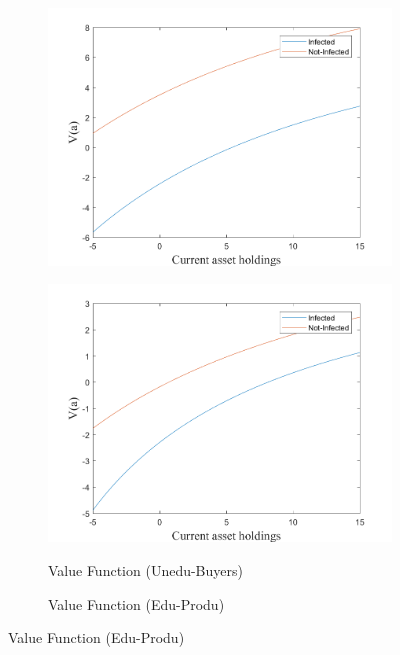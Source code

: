 \begin{figure}[H]
\begin{subfigure}{0.5\textwidth}
   \includegraphics[width=\linewidth,height = 0.22\textheight]{figures/matu/FIG13.png}
    \label{fig_dert}
\end{subfigure}
\hspace*{\fill}
\begin{subfigure}{0.5\textwidth}\caption{Value Function (Unedu-Buyers)}
   \includegraphics[width=\linewidth,height = 0.22\textheight]{figures/matu/FIG14.png}
    \label{fig:x_b}
\end{subfigure}
\bigskip
\begin{subfigure}{0.5\textwidth}\caption{Value Function (Edu-Produ)}

\end{subfigure}
\end{figure}
